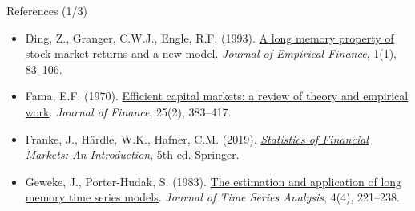 \begin{frame}{References (1/3)}
\begin{itemize}
    \item Ding, Z., Granger, C.W.J., Engle, R.F. (1993). \href{https://doi.org/10.1016/0927-5398(93)90006-D}{A long memory property of stock market returns and a new model}. \textit{Journal of Empirical Finance}, 1(1), 83--106.
    \item Fama, E.F. (1970). \href{https://doi.org/10.2307/2325486}{Efficient capital markets: a review of theory and empirical work}. \textit{Journal of Finance}, 25(2), 383--417.
    \item Franke, J., Härdle, W.K., Hafner, C.M. (2019). \href{https://doi.org/10.1007/978-3-030-13751-9}{\textit{Statistics of Financial Markets: An Introduction}}, 5th ed. Springer.
    \item Geweke, J., Porter-Hudak, S. (1983). \href{https://doi.org/10.1111/j.1467-9892.1983.tb00371.x}{The estimation and application of long memory time series models}. \textit{Journal of Time Series Analysis}, 4(4), 221--238.
\end{itemize}
\end{frame}

